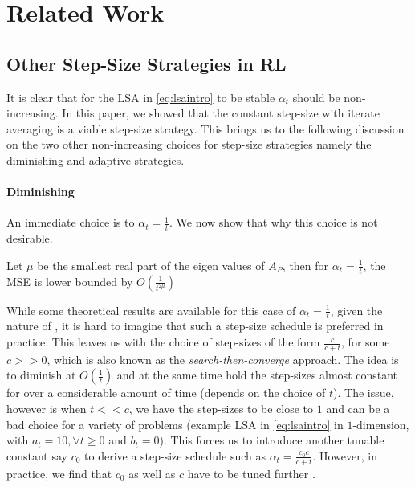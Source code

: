 \section{Related Work}\label{sec:related}
\subsection{Other Step-Size Strategies in RL}
It is clear that for the LSA in \eqref{eq:lsaintro} to be stable $\alpha_t$ should be non-increasing. In this paper, we showed that the constant step-size with iterate averaging is a viable step-size strategy.  This brings us to the following discussion on the two other non-increasing choices for step-size strategies namely the diminishing and adaptive strategies.
\paragraph{Diminishing} An immediate choice is to $\alpha_t=\frac{1}{t}$. We now show that why this choice is not desirable. 
\begin{theorem}\label{th:worst}
Let $\mu$ be the smallest real part of the eigen values of $A_P$, then for $\alpha_t=\frac1t$, the MSE is lower bounded by $O(\frac1{t^{2\mu}})$
\end{theorem}
While some theoretical results are available for this case of $\alpha_t=\frac1t$, given the nature of , it is hard to imagine that such a step-size schedule is preferred in practice. This leaves us with the choice of step-sizes of the form $\frac{c}{c+t}$, for some $c>>0$, which is also known as the \emph{search-then-converge} approach. The idea is to diminish at $O(\frac{1}t)$ and at the same time hold the step-sizes almost constant for over a considerable amount of time (depends on the choice of $t$). The issue, however is when $t<<c$, we have the step-sizes to be close to $1$ and can be a bad choice for a variety of problems (example LSA in \eqref{eq:lsaintro} in $1$-dimension, with $a_t=10,\forall t\geq 0$ and $b_t=0$). This forces us to introduce another tunable constant say $c_0$ to derive a step-size schedule such as $\alpha_t=\frac{c_0c}{c+t}$. However, in practice, we find that $c_0$ as well as $c$ have to be tuned further \cite{}.
